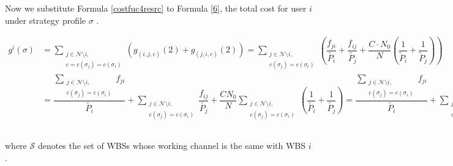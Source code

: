 \documentclass[times]{ettauth}
\theoremstyle{mytheoremstyle}
\theoremstyle{mytheoremstyle}
\theoremstyle{mytheoremstyle}
\begin{document}
Now we substitute Formula \ref{costfuc4resrc} to Formula \ref{6}, the total cost for user $i$ under strategy profile $\sigma$ . 

\begin{strip}
\begin{equation}
\label{cost1player}
\begin{split}
g^i(\sigma)
 &= \sum_{\substack{j\in \mathcal{N}\setminus i,\\ c=c(\sigma_j)=c(\sigma_i)}} (g_{(i,j,c)}(2) + g_{(j,i,c)}(2))
= \sum_{\substack{j\in \mathcal{N}\setminus i,\\ c(\sigma_j)=c(\sigma_i)}}(\dfrac{f_{ji}}{\tilde{P_i}} + \dfrac{f_{ij}}{\tilde{P_j}}+ \dfrac{C\cdot N_0}{N}(\dfrac{1}{\tilde P_i}+\dfrac{1}{\tilde P_j})) \\
& = \dfrac{\sum\limits_{\substack{j\in \mathcal{N}\setminus i,\\ c(\sigma_j)=c(\sigma_i)}}f_{ji}}{ \tilde{P_i}} + \sum_{\substack{j\in \mathcal{N}\setminus i, \\c(\sigma_j)=c(\sigma_i)}}\dfrac{f_{ij}}{\tilde{P_j}} + \dfrac{CN_0}{N}\sum_{\substack{j\in \mathcal{N}\setminus i,\\ c(\sigma_j)=c(\sigma_i)}}(\dfrac{1}{\tilde{P_i}}+\dfrac{1}{\tilde{P_j}})
 = \dfrac{\sum\limits_{\substack{j\in \mathcal{N}\setminus i,\\ c(\sigma_j)=c(\sigma_i)}}f_{ji}}{ \tilde{P_i}} + \sum_{\substack{j\in \mathcal{N}\setminus i,\\ c(\sigma_j)=c(\sigma_i)}}\dfrac{f_{ij}}{\tilde{P_j}} + \dfrac{2CN_0}{N}\sum_{\substack{i\in\mathcal{S}\subset\mathcal{N},\\\mathcal{S}:\forall i\in \mathcal{S}\\ c(\sigma_i)=c}}\dfrac{1}{\tilde{P_i}}\\
\end{split}
\end{equation}
\end{strip}

where $\mathcal{S}$ denotes the set of WBSs whose working channel is the same with WBS $i$.
\end{document}
